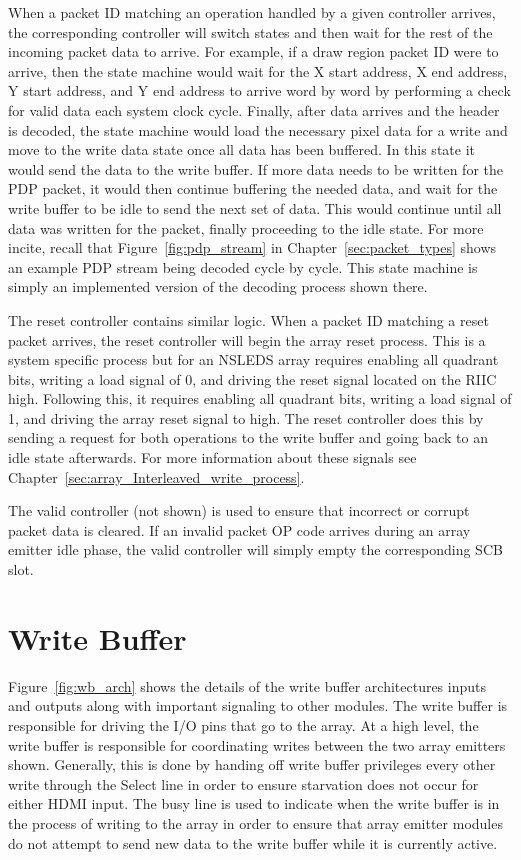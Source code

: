     When a packet ID matching an operation handled by a given controller arrives, the corresponding controller will switch states and then wait for the rest of the incoming packet data to arrive. For example, if a draw region packet ID were to arrive, then the state machine would wait for the X start address, X end address, Y start address, and Y end address to arrive word by word by performing a check for valid data each system clock cycle. Finally, after data arrives and the header is decoded, the state machine would load the necessary pixel data for a write and move to the write data state once all data has been buffered. In this state it would send the data to the write buffer. If more data needs to be written for the PDP packet, it would then continue buffering the needed data, and wait for the write buffer to be idle to send the next set of data. This would continue until all data was written for the packet, finally proceeding to the idle state. For more incite, recall that Figure~\ref{fig:pdp_stream} in Chapter~\ref{sec:packet_types} shows an example PDP stream being decoded cycle by cycle. This state machine is simply an implemented version of the decoding process shown there.

    The reset controller contains similar logic. When a packet ID matching a reset packet arrives, the reset controller will begin the array reset process. This is a system specific process but for an NSLEDS array requires enabling all quadrant bits, writing a load signal of 0, and driving the reset signal located on the RIIC high. Following this, it requires enabling all quadrant bits, writing a load signal of 1, and driving the array reset signal to high. The reset controller does this by sending a request for both operations to the write buffer and going back to an idle state afterwards. For more information about these signals see Chapter~\ref{sec:array_Interleaved_write_process}.

    The valid controller (not shown) is used to ensure that incorrect or corrupt packet data is cleared. If an invalid packet OP code arrives during an array emitter idle phase, the valid controller will simply empty the corresponding SCB slot.

\section{Write Buffer}

    Figure~\ref{fig:wb_arch} shows the details of the write buffer architectures inputs and outputs along with important signaling to other modules. The write buffer is responsible for driving the I/O pins that go to the array. At a high level, the write buffer is responsible for coordinating writes between the two array emitters shown. Generally, this is done by handing off write buffer privileges every other write through the Select line in order to ensure starvation does not occur for either HDMI input. The busy line is used to indicate when the write buffer is in the process of writing to the array in order to ensure that array emitter modules do not attempt to send new data to the write buffer while it is currently active.

